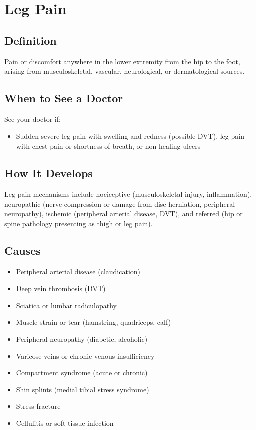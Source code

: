 \chapter{Leg Pain}

\section*{Definition}
Pain or discomfort anywhere in the lower extremity from the hip to the foot, arising from musculoskeletal, vascular, neurological, or dermatological sources.

\section*{When to See a Doctor}
See your doctor if:
\begin{itemize}
  \item Sudden severe leg pain with swelling and redness (possible DVT), leg pain with chest pain or shortness of breath, or non-healing ulcers
\end{itemize}

\section*{How It Develops}
Leg pain mechanisms include nociceptive (musculoskeletal injury, inflammation), neuropathic (nerve compression or damage from disc herniation, peripheral neuropathy), ischemic (peripheral arterial disease, DVT), and referred (hip or spine pathology presenting as thigh or leg pain).

\section*{Causes}
\begin{itemize}
  \item Peripheral arterial disease (claudication)
  \item Deep vein thrombosis (DVT)
  \item Sciatica or lumbar radiculopathy
  \item Muscle strain or tear (hamstring, quadriceps, calf)
  \item Peripheral neuropathy (diabetic, alcoholic)
  \item Varicose veins or chronic venous insufficiency
  \item Compartment syndrome (acute or chronic)
  \item Shin splints (medial tibial stress syndrome)
  \item Stress fracture
  \item Cellulitis or soft tissue infection
\end{itemize}

